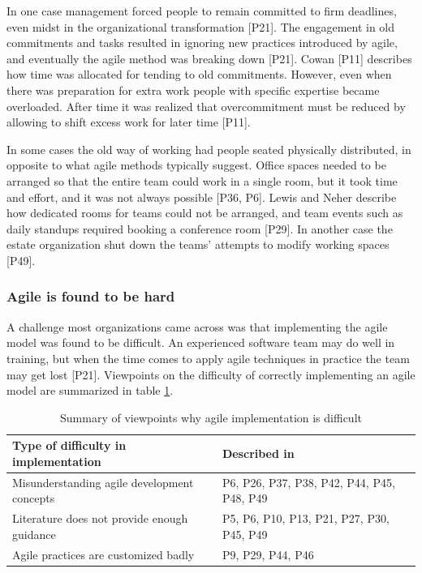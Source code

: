 \documentclass[preprint,authoryear,12pt]{elsarticle}
\begin{document}
In one case management forced people to remain committed to firm deadlines, even
midst in the organizational transformation [P21]. The engagement in old
commitments and tasks resulted in ignoring new practices introduced by agile,
and eventually the agile method was breaking down [P21].
Cowan [P11] describes how time was allocated for tending to old commitments.
However, even when there was preparation for extra work people with specific
expertise became overloaded. After time it was realized that overcommitment must
be reduced by allowing to shift excess work for later time [P11].



In some cases the old way of working had people seated physically distributed,
in opposite to what agile methods typically suggest. Office spaces needed to be
arranged so that the entire team could work in a single room, but it took time
and effort, and it was not always possible [P36, P6]. Lewis and Neher describe
how dedicated rooms for teams could not be arranged, and team events such as
daily standups required booking a conference room [P29]. In another case the
estate organization shut down the teams' attempts to modify working spaces
[P49].


\subsubsection{Agile is found to be hard}

A challenge most organizations came across was that implementing the agile model
was found to be difficult. An experienced software team may do well in training,
but when the time comes to apply agile techniques in practice the team may get
lost [P21]. Viewpoints on the difficulty of correctly implementing an agile
model are summarized in table \ref{table:challenges_difficulty}.


\begin{table}
    \begin{tabular}{ p{} p{} }
        \toprule
        Type of difficulty in implementation  &  Described in \\
        \midrule
        Misunderstanding agile development concepts  &
        P6, P26, P37, P38, P42, \newline
        P44, P45, P48, P49      \\
        Literature does not provide enough guidance  &
        P5, P6, P10, P13, P21, \newline
        P27, P30, P45, P49     \\
        Agile practices are customized badly   &
        P9, P29, P44, P46  \\
        \bottomrule
    \end{tabular}
    \caption{Summary of viewpoints why agile implementation is difficult}
    \label{table:challenges_difficulty}
\end{table}
\end{document}
